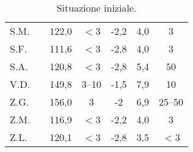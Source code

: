 \begin{table}[!h]
\begin{center}
\begin{tabular}{lcccccc}
S.M.	& \checkmark 	  				& 122,0 & $<$3  & -2,2 & 4,0 & 3      \\
S.F.	&  				  		& 111,6 & $<$3  & -2,8 & 4,0 & 3      \\
S.A.	&  				  		& 120,8 & $<$3  & -2,8 & 5,4 & 50     \\
V.D.	&  				  		& 149,8 & 3--10 & -1,5 & 7,9 & 10     \\
Z.G.	&  				  		& 156,0 & 3     & -2   & 6,9 & 25--50  \\
Z.M.	&  				  		& 116,9 & $<$3  & -2,2 & 4,0 & 3      \\
Z.L.	&  				  		& 120,1 & $<$3  & -2,8 & 3,5 & $<$3   \\
\bottomrule
\end{tabular}
\end{center}
\caption{Situazione iniziale.}
\label{tab:SituazioneIniziale}
\end{table}


